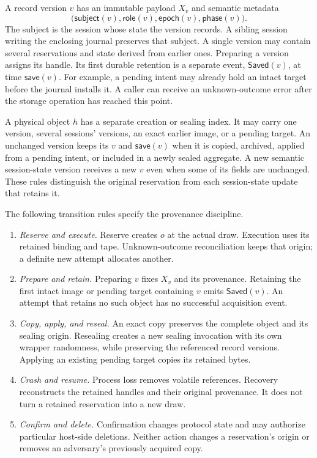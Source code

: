 \documentclass[pdflatex]{sn-jnl}
\theoremstyle{thmstyleone}
\theoremstyle{thmstylethree}
\theoremstyle{thmstyletwo}
\begin{document}
A record version $v$ has an immutable payload $X_v$ and semantic metadata
\[
  \bigl(\mathsf{subject}(v),\mathsf{role}(v),
         \mathsf{epoch}(v),\mathsf{phase}(v)\bigr).
\]
The subject is the session whose state the version records. A sibling
session writing the enclosing journal preserves that subject. A single
version may contain several reservations and state derived from earlier
ones. Preparing a version assigns its handle. Its first durable retention
is a separate event, $\mathsf{Saved}(v)$, at time $\mathsf{save}(v)$.
For example, a pending intent may already hold an intact target before
the journal installs it. A caller can receive an unknown-outcome error
after the storage operation has reached this point.

A physical object $h$ has a separate creation or sealing index.  It may carry
one version, several sessions' versions, an exact earlier image, or a pending
target.  An unchanged version keeps its $v$ and $\mathsf{save}(v)$ when it is
copied, archived, applied from a pending intent, or included in a newly sealed
aggregate.  A new semantic session-state version receives a new $v$ even when
some of its fields are unchanged.  These rules distinguish the original
reservation from each session-state update that retains it.

The following transition rules specify the provenance discipline.

\begin{enumerate}
  \item \emph{Reserve and execute.}  Reserve creates $o$ at the actual draw.
  Execution uses its retained binding and tape.  Unknown-outcome
  reconciliation keeps that origin; a definite new attempt allocates another.
  \item \emph{Prepare and retain.}  Preparing $v$ fixes $X_v$ and its provenance.
  Retaining the first intact image or pending target containing $v$ emits
  $\mathsf{Saved}(v)$.  An attempt that retains no such object has no successful
  acquisition event.
  \item \emph{Copy, apply, and reseal.}  An exact copy preserves the complete
  object and its sealing origin. Resealing creates a new sealing invocation
  with its own wrapper randomness, while preserving the referenced
  record versions.  Applying an existing pending target copies its retained
  bytes.
  \item \emph{Crash and resume.}  Process loss removes volatile references.
  Recovery reconstructs the retained handles and their original provenance.
  It does not turn a retained reservation into a new draw.
  \item \emph{Confirm and delete.}  Confirmation changes protocol state and may
  authorize particular host-side deletions.  Neither action changes a
  reservation's origin or removes an adversary's previously acquired copy.
\end{enumerate}
\end{document}

